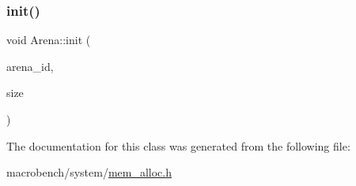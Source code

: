 \mbox{\label{classArena_ae036f0b8b6a694823caebe6a10755147}} 
\subsubsection{\texorpdfstring{init()}{init()}}
{\footnotesize\ttfamily void Arena\+::init (\begin{DoxyParamCaption}\item[{int}]{arena\+\_\+id,  }\item[{int}]{size }\end{DoxyParamCaption})}



The documentation for this class was generated from the following file\+:\begin{DoxyCompactItemize}
\item 
macrobench/system/\hyperlink{mem__alloc_8h}{mem\+\_\+alloc.\+h}\end{DoxyCompactItemize}
